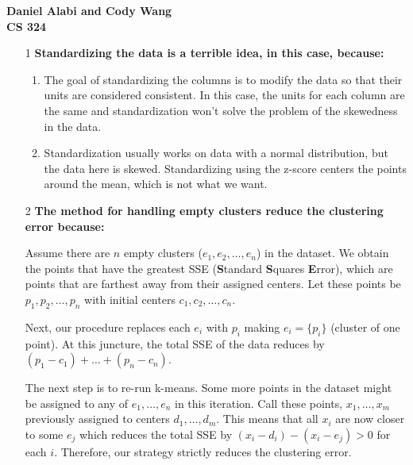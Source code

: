 \documentclass[12pt]{article}
\begin{document}
  \noindent \textbf{Daniel Alabi and Cody Wang} \\
  \textbf{CS 324}
  \hfill

  \begin{enumerate}
  \item[1] \textbf{Standardizing the data is a terrible idea, in this case,
    because:}
    \begin{enumerate}
      \item The goal of standardizing the columns is to modify the data so that their units are considered consistent. In this case, the units for each column are the same and standardization won't solve the problem of the skewedness in the data.
      \item Standardization usually works on data with a normal distribution, but the data here is skewed. Standardizing using the z-score centers the points around the mean, which is not what we want.

    \end{enumerate}
    
  \item[2] \textbf{The method for handling empty clusters reduce the clustering error because:}

    Assume there are $n$ empty clusters ($e_1, e_2, \ldots, e_n$) in the dataset. We obtain the points that have the greatest
      SSE (\textbf{S}tandard \textbf{S}quares \textbf{E}rror), which are points
      that are farthest away from their assigned centers. Let these points be
      $p_1, p_2, \ldots, p_n$ with initial centers $c_1, c_2, \ldots, c_n$. 
      
      Next, our procedure replaces each $e_i$ with $p_i$ making $e_i=\{p_i\}$
      (cluster of one point). At this juncture, the total SSE of the data
      reduces by $(p_1-c_1)+\ldots+(p_n-c_n)$. 
      
      The next step is to re-run
      k-means. Some more points in the dataset might be assigned to any of
      $e_1, \ldots, e_n$ in this iteration. Call these points, $x_1, \ldots, x_m$ previously assigned
      to centers $d_1, \ldots, d_m$. This means
      that all $x_i$ are now closer to some $e_j$ which reduces the 
      total SSE by $(x_i-d_i)-(x_i-e_j) > 0$ for each $i$.
      Therefore, our strategy strictly reduces the clustering error. 
    

\end{enumerate}
\end{document}
